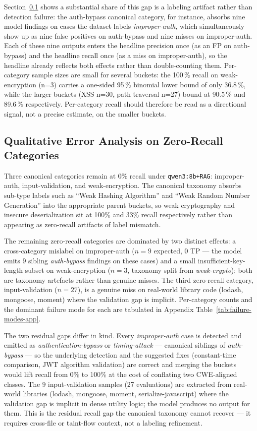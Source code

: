 Section~\ref{sec:eval-error-analysis} shows a substantial share of this gap is a labeling artifact rather than detection failure: the auth-bypass canonical category, for instance, absorbs nine model findings on cases the dataset labels \emph{improper-auth}, which simultaneously show up as nine false positives on auth-bypass and nine misses on improper-auth. Each of these nine outputs enters the headline precision once (as an FP on auth-bypass) and the headline recall once (as a miss on improper-auth), so the headline already reflects both effects rather than double-counting them. Per-category sample sizes are small for several buckets: the 100\,\% recall on weak-encryption (n=3) carries a one-sided 95\,\% binomial lower bound of only 36.8\,\%, while the larger buckets (XSS n=30, path traversal n=27) bound at 90.5\,\% and 89.6\,\% respectively. Per-category recall should therefore be read as a directional signal, not a precise estimate, on the smaller buckets.

\subsection{Qualitative Error Analysis on Zero-Recall Categories}
\label{sec:eval-error-analysis}

Three canonical categories remain at 0\% recall under \texttt{qwen3:8b+RAG}: improper-auth, input-validation, and weak-encryption. The canonical taxonomy absorbs sub-type labels such as ``Weak Hashing Algorithm'' and ``Weak Random Number Generation'' into the appropriate parent buckets, so weak cryptography and insecure deserialization sit at 100\% and 33\% recall respectively rather than appearing as zero-recall artifacts of label mismatch.

The remaining zero-recall categories are dominated by two distinct effects: a cross-category mislabel on improper-auth ($n = 9$ expected, 0 TP --- the model emits 9 sibling \emph{auth-bypass} findings on these cases) and a small insufficient-key-length subset on weak-encryption ($n = 3$, taxonomy split from \emph{weak-crypto}); both are taxonomy artefacts rather than genuine misses. The third zero-recall category, input-validation ($n = 27$), is a genuine miss on real-world library code (lodash, mongoose, moment) where the validation gap is implicit. Per-category counts and the dominant failure mode for each are tabulated in Appendix Table~\ref{tab:failure-modes-app}.

The two residual gaps differ in kind. Every \emph{improper-auth} case is detected and emitted as \emph{authentication-bypass} or \emph{timing-attack} --- canonical siblings of \emph{auth-bypass} --- so the underlying detection and the suggested fixes (constant-time comparison, JWT algorithm validation) are correct and merging the buckets would lift recall from 0\% to 100\% at the cost of conflating two CWE-aligned classes. The 9 input-validation samples (27 evaluations) are extracted from real-world libraries (lodash, mongoose, moment, serialize-javascript) where the validation gap is implicit in dense utility logic; the model produces no output for them. This is the residual recall gap the canonical taxonomy cannot recover --- it requires cross-file or taint-flow context, not a labeling refinement.

